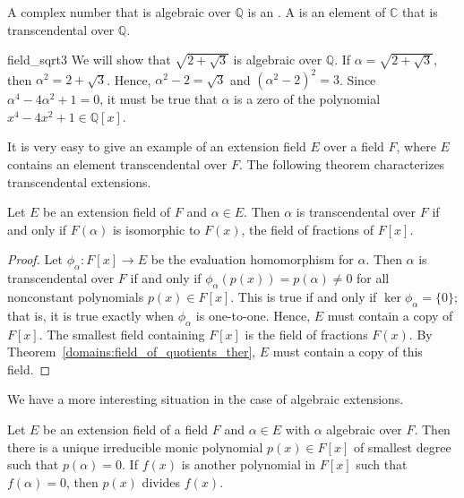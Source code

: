  
A complex number that is algebraic over ${\mathbb Q}$ is an . A  is an element of ${\mathbb C}$ that
is transcendental over ${\mathbb Q}$.  


\begin{example}{field_sqrt3}
We will show that $\sqrt{2 + \sqrt{3} }$ is algebraic over ${\mathbb Q}$.
If $\alpha = \sqrt{2 + \sqrt{3} }$, then $\alpha^2 = 2 + \sqrt{3}$.
Hence, $\alpha^2 -  2 = \sqrt{3}$ and $( \alpha^2 -  2)^2 = 3$. Since
$\alpha^4 - 4 \alpha^2 + 1 = 0$, it must be true that $\alpha$ is a
zero of the polynomial $x^4 - 4 x^2 + 1 \in {\mathbb Q}[x]$. 
\end{example}
 

It is very easy to give an example of an extension field $E$ over a 
field $F$, where $E$ contains an element transcendental over $F$. 
The following theorem characterizes transcendental extensions. 
 

\begin{theorem}
Let $E$ be an extension field of $F$ and $\alpha \in E$. Then $\alpha$ 
is transcendental over $F$ if and only if $F( \alpha )$ is isomorphic
to $F(x)$, the field of fractions of $F[x]$.
\end{theorem}
 
 
\begin{proof}
Let $\phi_{\alpha} : F[x] \rightarrow E$ be the evaluation
homomorphism for $\alpha$. Then $\alpha$ is transcendental over 
$F$ if and only if $\phi_{\alpha} (p(x)) = p(\alpha) \neq 0$ for all 
nonconstant polynomials $p(x) \in F[x]$.  This is true if and only 
if $\ker \phi_{\alpha} = \{ 0 \}$; that is, it is true exactly when 
$\phi_{\alpha}$ is one-to-one. Hence, $E$ must contain a copy of
$F[x]$.  The smallest field containing $F[x]$ is the field of
fractions $F(x)$.  By Theorem~\ref{domains:field_of_quotients_ther}, $E$ must contain a copy of this
field.
\end{proof}


\medskip

 
We have a more interesting situation in the case of algebraic
extensions.


\begin{theorem}
Let $E$ be an extension field of a field $F$ and $\alpha \in E$ with
$\alpha$ algebraic over $F$. Then there is a unique irreducible monic
polynomial $p(x) \in F[x]$ of smallest degree such that $p( \alpha ) =
0$. If $f(x)$ is another polynomial in $F[x]$ such that 
$f(\alpha) = 0$, then $p(x)$ divides $f(x)$.   
\end{theorem}

